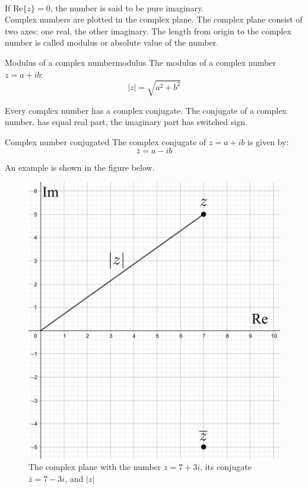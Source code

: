 \\
If $\text{Re}\{z\}=0$, the number is said to be pure imaginary.  
\\
Complex numbers are plotted in the complex plane. The complex plane consist of two axes: one real, the other imaginary.
The length from origin to the complex number is called modulus or absolute value of the number.
\begin{definition}{Modulus of a complex number}{modulus}
The modulus of a complex number $z=a+ib$:
$$\mid z\mid=\sqrt{a^2+b^2}$$
\end{definition}
\noindent
Every complex number has a complex conjugate. The conjugate of a complex number, has equal real part, the imaginary part has switched sign.
\begin{definition}{Complex number conjugated}{}
The complex conjugate of $z=a+ib$ is given by:
$$\bar{z}=a-ib$$
\end{definition}
\noindent An example is shown in the figure below.  
\begin{figure}[H]
\centering
\includegraphics[scale=0.2]{fig/img/complex_plan}
\caption{The complex plane with the number $z=7+3i$, its conjugate $\bar{z}=7-3i$, and $|z|$}
\end{figure}

